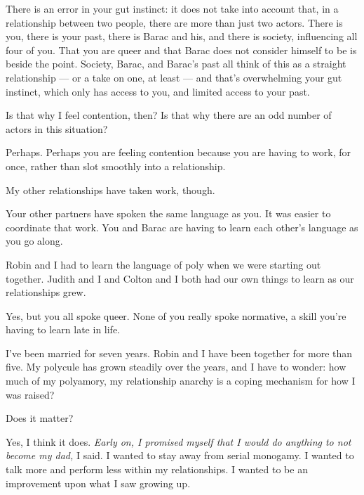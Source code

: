 \begin{paracol}{2}
\begin{leftcolumn}
\begin{ally}
There is an error in your gut instinct: it does not take into account that, in a relationship between two people, there are more than just two actors. There is you, there is your past, there is Barac and his, and there is society, influencing all four of you. That you are queer and that Barac does not consider himself to be is beside the point. Society, Barac, and Barac's past all think of this as a straight relationship --- or a take on one, at least --- and that's overwhelming your gut instinct, which only has access to you, and limited access to your past.
\end{ally}
Is that why I feel contention, then? Is that why there are an odd number of actors in this situation?

\begin{ally}
Perhaps. Perhaps you are feeling contention because you are having to work, for once, rather than slot smoothly into a relationship.
\end{ally}
My other relationships have taken work, though.

\begin{ally}
Your other partners have spoken the same language as you. It was easier to coordinate that work. You and Barac are having to learn each other's language as you go along.
\end{ally}
Robin and I had to learn the language of poly when we were starting out together. Judith and I and Colton and I both had our own things to learn as our relationships grew.

\begin{ally}
Yes, but you all spoke queer. None of you really spoke normative, a skill you're having to learn late in life.
\end{ally}
\newpage

\noindent I've been married for seven years. Robin and I have been together for more than five. My polycule has grown steadily over the years, and I have to wonder: how much of my polyamory, my relationship anarchy is a coping mechanism for how I was raised?

\begin{ally}
Does it matter?
\end{ally}
Yes, I think it does. \emph{Early on, I promised myself that I would do anything to not become my dad,} I said. I wanted to stay away from serial monogamy. I wanted to talk more and perform less within my relationships. I wanted to be an improvement upon what I saw growing up.


\end{leftcolumn}
\end{paracol}
